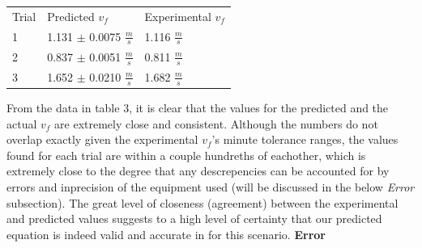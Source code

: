 \documentclass[12pt,letterpaper]{article}
\begin{document}
{\renewcommand{\arraystretch}{1.2}
\begin{table}[h]
\hspace*{1.2in}
\begin{tabular}{lll}
Trial  \hspace{.5in} & \hspace{0.15in} Predicted \(v_f\)\hspace{.5in} & Experimental \(v_f\)\\
\hspace{.14in}1&\hspace{0in} 1.131 \(\pm\) 0.0075 \(\frac{m}{s}\)& \hspace{0.3in}1.116 \(\frac{m}{s}\) \\
\hspace{.14in}2&\hspace{0in} 0.837 \(\pm\) 0.0051 \(\frac{m}{s}\)& \hspace{0.3in}0.811 \(\frac{m}{s}\) \\
\hspace{.14in}3&\hspace{0in} 1.652 \(\pm\) 0.0210 \(\frac{m}{s}\)& \hspace{0.3in}1.682 \(\frac{m}{s}\)\\                 
\end{tabular}
\end{table}
\newline\newline
From the data in table 3, it is clear that the values for the predicted and the actual \(v_f\) are extremely close and consistent. Although the numbers do not overlap exactly given the experimental \(v_f\)'s minute tolerance ranges, the values found for each trial are within a couple hundreths of eachother, which is extremely close to the degree that any descrepencies can be accounted for by errors and inprecision of the equipment used (will be discussed in the below \textit{Error} subsection). The great level of closeness (agreement) between the experimental and predicted values suggests to a high level of certainty that our predicted equation is indeed valid and accurate in for this scenario.
\newline\newline
\textbf{Error}
\newline
}
\end{document}
